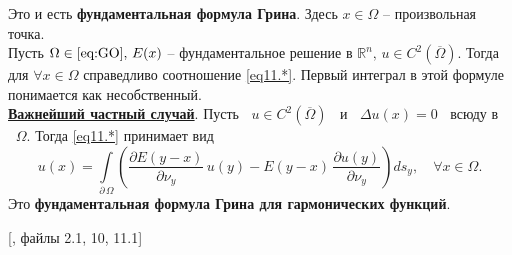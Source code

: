 \noindent Это и есть \textbf{фундаментальная формула Грина}. Здесь $x \in \Omega$ -- произвольная точка.\\

 Пусть $\Omega \in \eqref{eq:GO}, \, E(x)$ -- фундаментальное решение в $\mathbb{R}^n, \, u \in C^2(\overline{\Omega}).$ Тогда для $\forall x \in \Omega$ справедливо соотношение \eqref{eq11.*}. Первый интеграл в этой формуле понимается как несобственный.\\

\noindent \underline{\textbf{Важнейший частный случай}}. Пусть $\;\;u \in C^2(\overline{\Omega})\;\;$ и $\;\;\Delta u(x) = 0\;\;$ всюду\;\; в $\;\;\Omega.$ Тогда \eqref{eq11.*} принимает вид
\begin{equation*}
    u(x) = \int\limits_{\partial \, \Omega} \left ( \frac{\partial E(y-x)}{\partial \nu_y} \, u(y) - E(y-x) \, \frac{\partial u(y)}{\partial \nu_y} \right ) d s_y, \quad \forall x \in \Omega.
\end{equation*}
\noindent Это \textbf{фундаментальная формула Грина для гармонических функций}. 
\setcounter{equation}{0}

[\cite{umf_tix}, файлы 2.1, 10, 11.1]